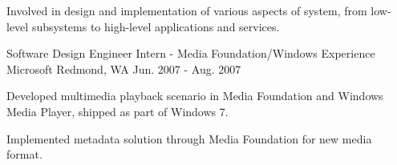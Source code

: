 \begin{cventries}
{\begin{cvitems}
        \item {Involved in design and implementation of various aspects of system, from low-level subsystems to high-level applications and services.}
      \end{cvitems} 
    }
  \cventry
    {Software Design Engineer Intern - Media Foundation/Windows Experience}
    {Microsoft}
    {Redmond, WA}
    {Jun. 2007 - Aug. 2007}
    {
      \begin{cvitems}
        \item {Developed multimedia playback scenario in Media Foundation and Windows Media Player, shipped as part of Windows 7.}
        \item {Implemented metadata solution through Media Foundation for new media format. }
      \end{cvitems}
    }
\end{cventries}
